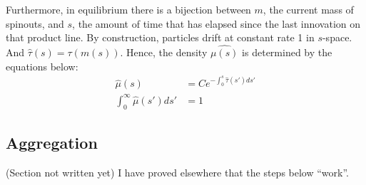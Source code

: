 \documentclass[12pt,english]{article}
\theoremstyle{remark}
\begin{document}
Furthermore, in equilibrium there is a bijection between $m$, the current mass of spinouts, and $s$, the amount of time that has elapsed since the last innovation on that product line. By construction, particles drift at constant rate 1 in $s$-space. And $\hat{\tau}(s) = \tau(m(s))$. Hence, the density $\hat{\mu(s)}$ is determined by the equations below:
\begin{align*}
	\hat{\mu}(s) &= Ce^{-\int_0^s \hat{\tau}(s')ds'} \\
	\int_0^{\infty} \hat{\mu}(s') ds' &= 1
\end{align*}

\subsection{Aggregation}

(Section not written yet) I have proved elsewhere that the steps below ``work''. 
\end{document}
